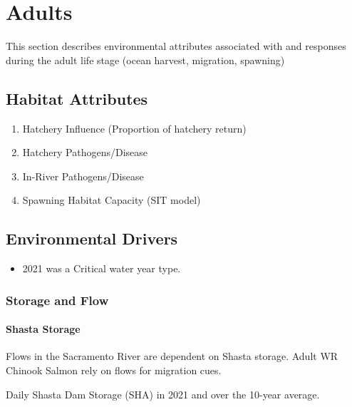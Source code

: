 \documentclass[
]{book}
\providecommand{\tightlist}{%
  \setlength{\itemsep}{0pt}\setlength{\parskip}{0pt}}
\theoremstyle{definition}
\theoremstyle{definition}
\theoremstyle{definition}
\theoremstyle{definition}
\theoremstyle{remark}
\begin{document}
\hypertarget{adults}{%
\chapter{Adults}\label{adults}}

This section describes environmental attributes associated with and responses during the adult life stage (ocean harvest, migration, spawning)

\hypertarget{habitat-attributes}{%
\section{Habitat Attributes}\label{habitat-attributes}}

\begin{enumerate}
\def\labelenumi{\arabic{enumi}.}
\item
  Hatchery Influence (Proportion of hatchery return)
\item
  Hatchery Pathogens/Disease
\item
  In-River Pathogens/Disease
\item
  Spawning Habitat Capacity (SIT model)
\end{enumerate}

\hypertarget{wq}{%
\section{Environmental Drivers}\label{wq}}

\begin{itemize}
\tightlist
\item
  2021 was a Critical water year type.
\end{itemize}

\hypertarget{storage-and-flow}{%
\subsection{Storage and Flow}\label{storage-and-flow}}

\hypertarget{shasta-storage}{%
\subsubsection{Shasta Storage}\label{shasta-storage}}

Flows in the Sacramento River are dependent on Shasta storage. Adult WR Chinook Salmon rely on flows for migration cues.

\label{fig:SHAstor-fig}Daily Shasta Dam Storage (SHA) in 2021 and over the 10-year average.
\end{document}
